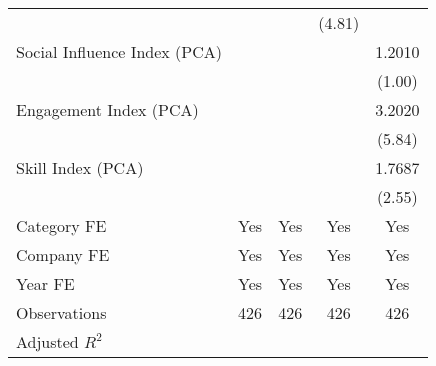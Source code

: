 {\begin{tabular}{l*{4}{c}}
                                   &                     &                     &      (4.81)         &                     \\
[1em]
Social Influence Index (PCA)       &                     &                     &                     &      1.2010         \\
                                   &                     &                     &                     &      (1.00)         \\
[1em]
Engagement Index (PCA)             &                     &                     &                     &      3.2020\sym{***}\\
                                   &                     &                     &                     &      (5.84)         \\
[1em]
Skill Index (PCA)                  &                     &                     &                     &      1.7687\sym{**} \\
                                   &                     &                     &                     &      (2.55)         \\
[1em]
Category FE                        &         Yes         &         Yes         &         Yes         &         Yes         \\
[1em]
Company FE                         &         Yes         &         Yes         &         Yes         &         Yes         \\
[1em]
Year FE                            &         Yes         &         Yes         &         Yes         &         Yes         \\
\hline
Observations                       &         426         &         426         &         426         &         426         \\
Adjusted \(R^{2}\)                 &                     &                     &                     &                     \\
\hline\hline
\end{tabular}
}
